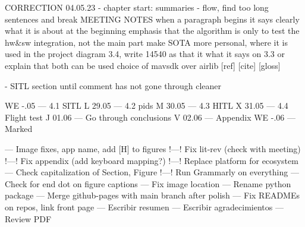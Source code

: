 CORRECTION 04.05.23
 - chapter start: summaries
 - flow, find too long sentences and break
 MEETING NOTES
when a paragraph begins it says clearly what it is about at the beginning
emphasis that the algorithm is only to test the hw&sw integration, not the main part
make SOTA more personal, where it is used in the project
diagram 3.4, write 14540 as that it what it says on 3.3 or explain that both can be used
choice of mavsdk over airlib
[ref] [cite] [gloss]

- SITL section until comment has not gone through cleaner

 

WE -.05 --- 4.1 SITL
L 29.05 --- 4.2 pids
M 30.05 --- 4.3 HITL
X 31.05 --- 4.4 Flight test
J 01.06 --- Go through conclusions
V 02.06 --- Appendix
WE -.06 --- Marked

        --- Image fixes, app name, add [H] to figures
        !---! Fix lit-rev (check with meeting)
        !---! Fix appendix (add keyboard mapping?)
        !---! Replace platform for ecosystem
        --- Check capitalization of Section, Figure
        !---! Run Grammarly on everything
        --- Check for end dot on figure captions
        --- Fix image location
        --- Rename python package
        --- Merge github-pages with main branch after polish
        --- Fix READMEs on repos, link front page
        --- Escribir resumen
        --- Escribir agradecimientos
        --- Review PDF